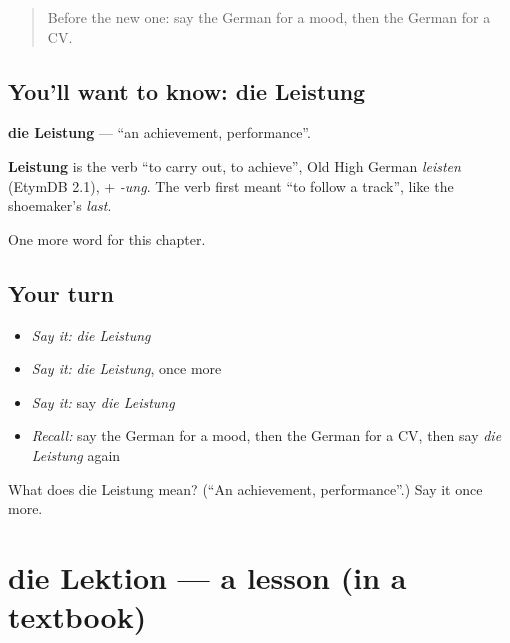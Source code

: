 \label{lesson:GE-C233-leistung}



\begin{quote}
Before the new one: say the German for a mood, then the German for a CV.
\end{quote}

\subsection*{You'll want to know: die Leistung}
\textbf{die Leistung} — \textquotedblleft{}an achievement, performance\textquotedblright{}.

\begin{cousinweb}
\textbf{Leistung} is the verb \textquotedblleft{}to carry out, to achieve\textquotedblright{}, Old High German \emph{leisten} (EtymDB 2.1), + \emph{-ung}. The verb first meant \textquotedblleft{}to follow a track\textquotedblright{}, like the shoemaker's \emph{last}.
\end{cousinweb}

\begin{grammarlens}[title={What you've built}]
One more word for this chapter.
\end{grammarlens}

\subsection*{Your turn}
\begin{itemize}
\raggedright
  \item \emph{Say it:} \emph{die Leistung}
  \item \emph{Say it:} \emph{die Leistung}, once more
  \item \emph{Say it:} say \emph{die Leistung}
  \item \emph{Recall:} say the German for a mood, then the German for a CV, then say \emph{die Leistung} again
\end{itemize}

\begin{tcolorbox}[breakable,colback=teal!4,colframe=teal!35!black,title={Before you move on}]
What does die Leistung mean? (\textquotedblleft{}An achievement, performance\textquotedblright{}.) Say it once more.
\end{tcolorbox}
\section[die Lektion]{die Lektion — a lesson (in a textbook)}

